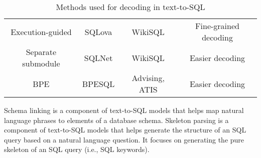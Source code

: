 \begin{table}
\begin{tabular}{|c|c|c|c|}
                                                                   &                                                                                                                                            \\
        \hline
        Execution-guided                                           & SQLova              & WikiSQL                   & Fine-grained decoding                                                                    \\
        \hline
        Separate submodule                                         & SQLNet              & WikiSQL                   & Easier decoding                                                                          \\
        \hline
        BPE                                                        & BPESQL              & Advising, ATIS
                                                                   & Easier decoding
        \\
        \hline
    \end{tabular}
    \caption{Methods used for decoding in text-to-SQL \cite{deng2022recent}}
    \label{tab:decoders}
\end{table}










Schema linking is a component of text-to-SQL models that helps map natural language phrases to elements of a database schema.
Skeleton parsing is a component of text-to-SQL models that helps generate the structure of an SQL query based on a natural language question. It focuses on generating the pure skeleton of an SQL query (i.e., SQL keywords).